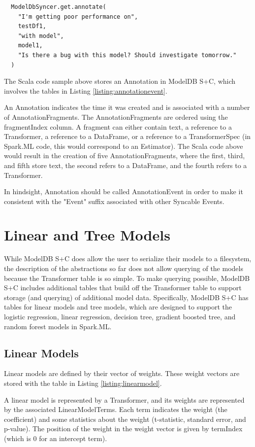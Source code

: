 \begin{verbatim}
  ModelDbSyncer.get.annotate(
    "I'm getting poor performance on", 
    testDf1, 
    "with model", 
    model1, 
    "Is there a bug with this model? Should investigate tomorrow."
  )
\end{verbatim}

The Scala code sample above stores an Annotation in ModelDB S+C, which involves
the tables in Listing \ref{listing:annotationevent}.

An Annotation indicates the time it was created and is associated with a number
of AnnotationFragments. The AnnotationFragments are ordered using the fragmentIndex
column. A fragment can either contain text, a reference to a Transformer, a reference
to a DataFrame, or a reference to a TransformerSpec (in Spark.ML code, this would
correspond to an Estimator). The Scala code above would result in the creation
of five AnnotationFragments, where the first, third, and fifth store text, the second
refers to a DataFrame, and the fourth refers to a Transformer.

In hindsight, Annotation should be called AnnotationEvent in order to make
it consistent with the "Event" suffix associated with other Syncable Events.

\section{Linear and Tree Models}

While ModelDB S+C does allow the user to serialize their models to a filesystem,
the description of the abstractions so far does not allow querying of the models
because the Transformer table is so simple. To make querying possible, ModelDB S+C
includes additional tables that build off the Transformer table to support storage
(and querying) of additional model data. Specifically, ModelDB S+C has tables for
linear models and tree models, which are designed to support the logistic regression,
linear regression, decision tree, gradient boosted tree, and random forest models in
Spark.ML.

\subsection{Linear Models}

Linear models are defined by their vector of weights. These weight vectors are
stored with the table in Listing \ref{listing:linearmodel}.

A linear model is represented by a Transformer, and its weights are represented
by the associated LinearModelTerms. Each term indicates the weight (the coefficient) and
some statistics about the weight (t-statistic, standard error, and p-value). The position
of the weight in the weight vector is given by termIndex (which is 0 for an intercept
term).

